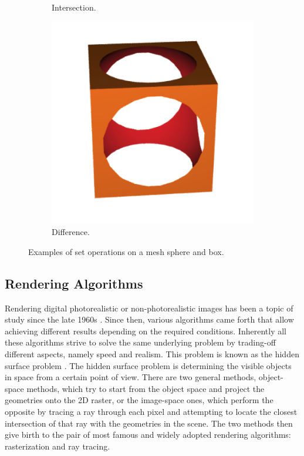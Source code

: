 \documentclass[a4paper,11pt,oneside]{article}
\begin{document}
\begin{figure}[ht]
\begin{subfigure}[b]{0.3\textwidth}
		\caption{Intersection.}
		\label{sec1:intersection}
	\end{subfigure}
	\hfill
	\begin{subfigure}[b]{0.3\textwidth}
		\centering
		\includegraphics[width=\textwidth]{section1/difference.png}
		\caption{Difference.}
		\label{sec1:difference}
	\end{subfigure}
	\hfill
	\caption{Examples of set operations on a mesh sphere and box.}
	\label{sec1:set-operations-examples}
\end{figure}

  
\subsection{Rendering Algorithms}
  
Rendering digital photorealistic or non-photorealistic images has been a topic of study since the late 1960s \cite{INITIAL_RENDERING}. Since then, various algorithms came forth that allow achieving different results depending on the required conditions. Inherently all these algorithms strive to solve the same underlying problem by trading-off different aspects, namely speed and realism. This problem is known as the hidden surface problem \cite{hidden-surface-problem}. The hidden surface problem is determining the visible objects in space from a certain point of view. There are two general methods, object-space methods, which try to start from the object space and project the geometries onto the 2D raster, or the image-space ones, which perform the opposite by tracing a ray through each pixel and attempting to locate the closest intersection of that ray with the geometries in the scene. The two methods then give birth to the pair of most famous and widely adopted rendering algorithms: rasterization and ray tracing.
  
\end{document}
